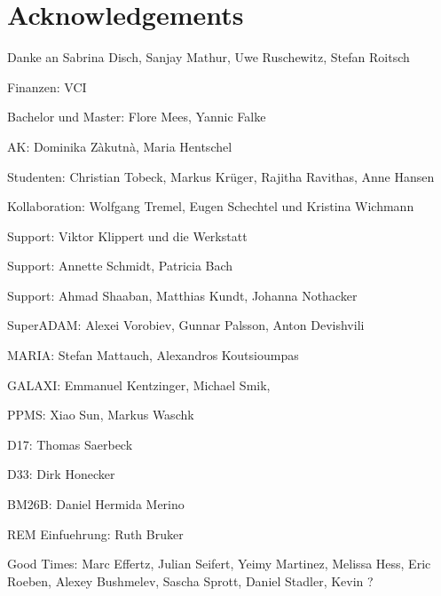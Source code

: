 \documentclass[\main/dresen_thesis.tex]{subfiles}
\begin{document}
	\section*{Acknowledgements}
	Danke an Sabrina Disch, Sanjay Mathur, Uwe Ruschewitz, Stefan Roitsch

	Finanzen: VCI

	Bachelor und Master: Flore Mees, Yannic Falke

	AK: Dominika Zàkutnà, Maria Hentschel

	Studenten: Christian Tobeck, Markus Kr\"uger, Rajitha Ravithas, Anne Hansen

	Kollaboration: Wolfgang Tremel, Eugen Schechtel und Kristina Wichmann

	Support: Viktor Klippert und die Werkstatt

	Support: Annette Schmidt, Patricia Bach

	Support: Ahmad Shaaban, Matthias Kundt, Johanna Nothacker

	SuperADAM: Alexei Vorobiev, Gunnar Palsson, Anton Devishvili

	MARIA: Stefan Mattauch, Alexandros Koutsioumpas

	GALAXI: Emmanuel Kentzinger, Michael Smik,

	PPMS: Xiao Sun, Markus Waschk

	D17: Thomas Saerbeck

	D33: Dirk Honecker

	BM26B: Daniel Hermida Merino

	REM Einfuehrung: Ruth Bruker

	Good Times: Marc Effertz, Julian Seifert, Yeimy Martinez, Melissa Hess, Eric Roeben, Alexey Bushmelev, Sascha Sprott, Daniel Stadler, Kevin ?
\end{document}
